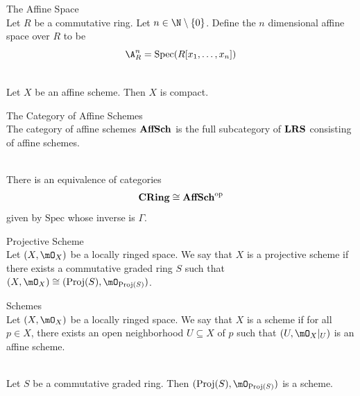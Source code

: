 \documentclass[a4paper]{article}
\begin{document}
\begin{defn}{The Affine Space}{}\\
Let $R$ be a commutative ring. Let $n\in\N\setminus\{0\}$. Define the $n$ dimensional affine space over $R$ to be $$\A_R^n=\text{Spec}(R[x_1,\dots,x_n])$$
\end{defn}

\begin{prp}{}{}\\
Let $X$ be an affine scheme. Then $X$ is compact. 
\end{prp}

\begin{defn}{The Category of Affine Schemes}{}\\
The category of affine schemes $\bold{AffSch}$ is the full subcategory of $\bold{LRS}$ consisting of affine schemes. 
\end{defn}

\begin{lmm}{}{}\\
There is an equivalence of categories $$\bold{CRing}\cong\bold{AffSch}^{\text{op}}$$ given by $\text{Spec}$ whose inverse is $\Gamma$. 
\end{lmm}

\begin{defn}{Projective Scheme}{}\\
Let $(X,\mO_X)$ be a locally ringed space. We say that $X$ is a projective scheme if there exists a commutative graded ring $S$ such that $(X,\mO_X)\cong(\text{Proj}(S),\mO_{\text{Proj}(S)})$. 
\end{defn}

\begin{defn}{Schemes}{}\\
Let $(X,\mO_X)$ be a locally ringed space. We say that $X$ is a scheme if for all $p\in X$, there exists an open neighborhood $U\subseteq X$ of $p$ such that $(U,\mO_X|_U)$ is an affine scheme. 
\end{defn}

\begin{prp}{}{}\\
Let $S$ be a commutative graded ring. Then $(\text{Proj}(S),\mO_{\text{Proj}(S)})$ is a scheme. 
\end{prp}
\end{document}
